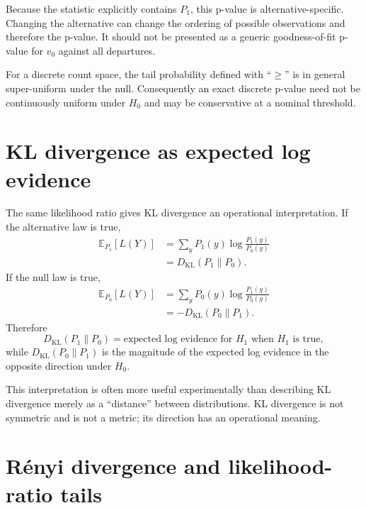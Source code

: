 \documentclass[11pt]{article}
\newcommand{\KL}{D_{\mathrm{KL}}}
\newcommand{\Pnull}{P_0}
\newcommand{\Palt}{P_1}
\newcommand{\E}{\mathbb{E}}
\begin{document}
Because the statistic explicitly contains $P_1$, this p-value is
alternative-specific. Changing the alternative can change the ordering of
possible observations and therefore the p-value. It should not be presented as
a generic goodness-of-fit p-value for $v_0$ against all departures.

For a discrete count space, the tail probability defined with ``$\ge$'' is in
general super-uniform under the null. Consequently an exact discrete p-value
need not be continuously uniform under $H_0$ and may be conservative at a
nominal threshold.

\section{KL divergence as expected log evidence}

The same likelihood ratio gives KL divergence an operational interpretation.
If the alternative law is true,
\begin{align}
\E_{\Palt}[L(Y)]
&=\sum_y \Palt(y)\log\frac{\Palt(y)}{\Pnull(y)}\\
&=\KL(\Palt\|\Pnull).
\end{align}
If the null law is true,
\begin{align}
\E_{\Pnull}[L(Y)]
&=\sum_y \Pnull(y)\log\frac{\Palt(y)}{\Pnull(y)}\\
&=-\KL(\Pnull\|\Palt).
\end{align}
Therefore
\begin{equation}
\boxed{
\KL(\Palt\|\Pnull)
=\text{expected log evidence for }H_1\text{ when }H_1\text{ is true},
}
\end{equation}
while $\KL(\Pnull\|\Palt)$ is the magnitude of the expected log evidence in
the opposite direction under $H_0$.

This interpretation is often more useful experimentally than describing KL
divergence merely as a ``distance'' between distributions. KL divergence is
not symmetric and is not a metric; its direction has an operational meaning.

\section{Rényi divergence and likelihood-ratio tails}
\end{document}
